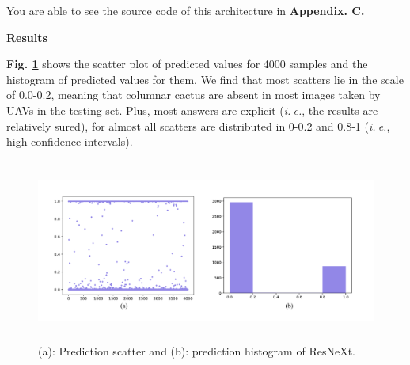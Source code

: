 \documentclass[a4paper]{article}
\begin{document}
\large{You are able to see the source code of this architecture in \textbf{Appendix. C.}}
\vspace{2mm}
\begin{center}
\large\textbf{Results} \\
\end{center}

\large{

\textbf{Fig. \ref{resxresults}} shows the scatter plot of predicted values for 4000 samples and the histogram of predicted values for them. We find that most scatters lie in the scale of 0.0-0.2, meaning that columnar cactus are absent in most images taken by UAVs in the testing set. Plus, most answers are explicit (\textit{i.$\ $e.}, the results are relatively sured), for almost all scatters are distributed in 0-0.2 and 0.8-1 (\textit{i.$\ $e.}, high confidence intervals).

}

\begin{figure}[h]
\centering
\includegraphics[width=15cm,height=6cm]{resx_best.pdf}
\caption{ (a): Prediction scatter and (b): prediction histogram of \textsf{ResNeXt}.}
\label{resxresults}
\end{figure}
\end{document}
